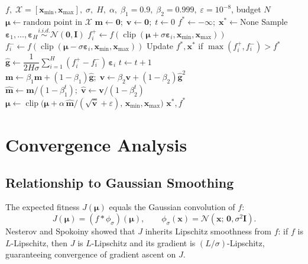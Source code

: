 \documentclass[12pt, a4paper]{article}
\newcommand{\bmu}{\boldsymbol{\mu}}
\newcommand{\beps}{\boldsymbol{\varepsilon}}
\newcommand{\bx}{\mathbf{x}}
\newcommand{\mvec}{\mathbf{m}}           %
\newcommand{\vvec}{\mathbf{v}}           %
\newcommand{\mhat}{\hat{\mathbf{m}}}     %
\newcommand{\vhat}{\hat{\mathbf{v}}}     %
\newcommand{\NN}{\mathcal{N}}
\newcommand{\cX}{\mathcal{X}}
\DeclareMathOperator{\clip}{clip}
\begin{document}
\begin{algorithm}[H]
  \caption{ES-RL with Antithetic Sampling and Adam}
  \label{alg:esrl}
  \begin{algorithmic}[1]
    \Require $f,\;\cX{=}[\bx_{\min},\bx_{\max}],\;
             \sigma,\;H,\;\alpha,\;
             \beta_1{=}0.9,\;\beta_2{=}0.999,\;
             \varepsilon{=}10^{-8}$, budget $N$
    \State $\bmu \leftarrow \text{random point in } \cX$
    \State $\mvec\leftarrow\mathbf{0};\;
           \vvec\leftarrow\mathbf{0};\;
           t\leftarrow 0$
    \State $f^*\leftarrow-\infty;\;\bx^*\leftarrow\text{None}$
      \State Sample $\beps_1,\ldots,\beps_H \overset{i.i.d.}{\sim}
             \NN(\mathbf{0},\mathbf{I})$
        \State $f^+_i\leftarrow f\!\left(\clip(\bmu+\sigma\beps_i,
               \bx_{\min},\bx_{\max})\right)$
        \State $f^-_i\leftarrow f\!\left(\clip(\bmu-\sigma\beps_i,
               \bx_{\min},\bx_{\max})\right)$
        \State Update $f^*,\bx^*$ if $\max(f^+_i,f^-_i)>f^*$
      \EndFor
      \State $\hat{\mathbf{g}}\leftarrow
             \dfrac{1}{2H\sigma}\displaystyle\sum_{i=1}^{H}
             (f^+_i-f^-_i)\,\beps_i$
      \State $t\leftarrow t+1$
      \State $\mvec\leftarrow\beta_1\mvec+(1-\beta_1)\hat{\mathbf{g}};\;
             \vvec\leftarrow\beta_2\vvec+(1-\beta_2)\hat{\mathbf{g}}^2$
      \State $\mhat\leftarrow\mvec/(1-\beta_1^t);\;
             \vhat\leftarrow\vvec/(1-\beta_2^t)$
      \State $\bmu\leftarrow\clip\!\bigl(
             \bmu+\alpha\,\mhat/(\sqrt{\vhat}+\varepsilon),\,
             \bx_{\min},\bx_{\max}\bigr)$
    \EndWhile
    \State\Return $\bx^*,f^*$
  \end{algorithmic}
\end{algorithm}

\section{Convergence Analysis}
\label{sec:convergence}

\subsection{Relationship to Gaussian Smoothing}

The expected fitness $J(\bmu)$ equals the Gaussian convolution of $f$:
\begin{equation}
  J(\bmu) = (f*\phi_\sigma)(\bmu),\qquad
  \phi_\sigma(\bx) = \NN(\bx;\,\mathbf{0},\sigma^2\mathbf{I}).
\end{equation}
Nesterov and Spokoiny \cite{nesterov2017} showed that $J$ inherits Lipschitz
smoothness from $f$: if $f$ is $L$-Lipschitz, then $J$ is $L$-Lipschitz
and its gradient is $(L/\sigma)$-Lipschitz, guaranteeing convergence
of gradient ascent on $J$.
\end{document}
